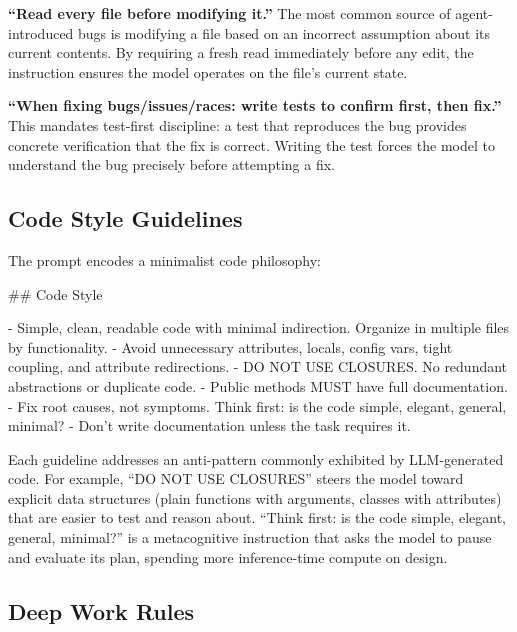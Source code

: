 \documentclass{article}
\begin{document}
\textbf{``Read every file before modifying it.''}  The most common source of agent-introduced bugs is modifying a file based on an incorrect assumption about its current contents.  By requiring a fresh read immediately before any edit, the instruction ensures the model operates on the file's current state.

\textbf{``When fixing bugs/issues/races: write tests to confirm first, then fix.''}  This mandates test-first discipline: a test that reproduces the bug provides concrete verification that the fix is correct.  Writing the test forces the model to understand the bug precisely before attempting a fix.

\subsection{Code Style Guidelines}
\label{app:code-style}

The prompt encodes a minimalist code philosophy:

\begin{prompt}
## Code Style

- Simple, clean, readable code with minimal indirection. Organize in multiple files by functionality.
- Avoid unnecessary attributes, locals, config vars, tight coupling, and attribute redirections.
- DO NOT USE CLOSURES. No redundant abstractions or duplicate code.
- Public methods MUST have full documentation.
- Fix root causes, not symptoms. Think first: is the code simple, elegant, general, minimal?
- Don't write documentation unless the task requires it.
\end{prompt}

Each guideline addresses an anti-pattern commonly exhibited by LLM-generated code.  For example, ``DO NOT USE CLOSURES'' steers the model toward explicit data structures (plain functions with arguments, classes with attributes) that are easier to test and reason about.  ``Think first: is the code simple, elegant, general, minimal?'' is a metacognitive instruction that asks the model to pause and evaluate its plan, spending more inference-time compute on design.

\subsection{Deep Work Rules}
\label{app:deep-work}
\end{document}
